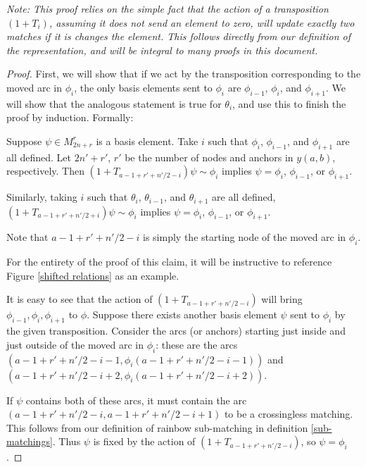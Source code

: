 \documentclass{amsart}
\begin{document}
\vspace{1.5mm}
\textit{\label{two humps created}Note: This proof relies on the simple fact that the action of a transposition $(1+T_i)$, assuming it does not send an element to zero, will update exactly two matches if it is changes the element. This follows directly from our definition of the representation, and will be integral to many proofs in this document.}

\vspace{1.5mm}
\begin{proof}
	
	
	First, we will show that if we act by the transposition corresponding to the moved arc in $\phi_i$, the only basis elements sent to $\phi_i$ are $\phi_{i-1}$, $\phi_{i}$, and $\phi_{i+1}$. We will show that the analogous statement is true for $\theta_i$, and use this to finish the proof by induction. Formally:
	
	\begin{claim*}
		Suppose $\psi\in M_{2n+r}^r$ is a basis element. Take $i$ such that $\phi_i$, $\phi_{i-1}$, and $\phi_{i+1}$ are all defined. Let $2n'+r'$, $r'$ be the number of nodes and anchors in $y(a,b)$, respectively. Then $(1+T_{a-1+r'+n'/2-i})\psi\sim \phi_i$ implies $\psi=\phi_i$, $\phi_{i-1}$, or $\phi_{i+1}$.
		
		Similarly, taking $i$ such that $\theta_i$, $\theta_{i-1}$, and $\theta_{i+1}$ are all defined, $(1+T_{a-1+r'+n'/2+i})\psi\sim \phi_i$ implies $\psi=\phi_i$, $\phi_{i-1}$, or $\phi_{i+1}$.
	\end{claim*}	
	
	Note that $a-1+r'+n'/2-i$ is simply the starting node of the moved arc in $\phi_i$.
	
	For the entirety of the proof of this claim, it will be instructive to reference Figure \ref{shifted relations} as an example.
	
	It is easy to see that the action of $(1+T_{a-1+r'+n'/2-i})$ will bring $\phi_{i-1},\phi_i,\phi_{i+1}$ to $\phi$. Suppose there exists another basis element $\psi$ sent to $\phi_i$ by the given transposition. Consider the arcs (or anchors) starting just inside and just outside of the moved arc in $\phi_i$: these are the arcs $(a-1+r'+n'/2-i-1,\phi_i(a-1+r'+n'/2-i-1))$ and $(a-1+r'+n'/2-i+2,\phi_i(a-1+r'+n'/2-i+2))$. 
	
	If $\psi$ contains both of these arcs, it must contain the arc $(a-1+r'+n'/2-i,a-1+r'+n'/2-i+1)$ to be a crossingless matching. This follows from our definition of rainbow sub-matching in definition \ref{sub-matchings}. Thus $\psi$ is fixed by the action of $(1+T_{a-1+r'+n'/2-i})$, so $\psi=\phi_i$.
	

\end{proof}
\end{document}
